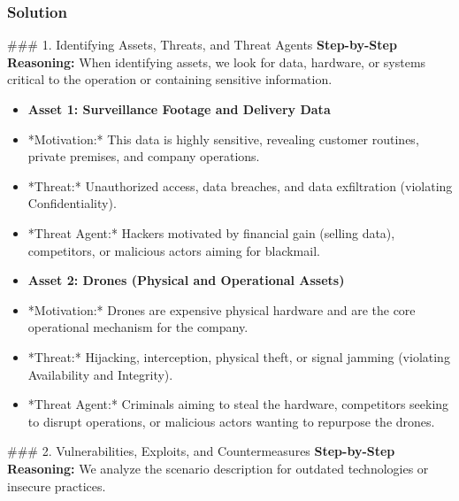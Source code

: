 \documentclass{article}
\begin{document}
\subsubsection*{Solution}
\#\#\# 1. Identifying Assets, Threats, and Threat Agents
\textbf{Step-by-Step Reasoning:}
When identifying assets, we look for data, hardware, or systems critical to the operation or containing sensitive information.
\begin{itemize}
    \item \textbf{Asset 1: Surveillance Footage and Delivery Data}
    \item *Motivation:* This data is highly sensitive, revealing customer routines, private premises, and company operations.
    \item *Threat:* Unauthorized access, data breaches, and data exfiltration (violating Confidentiality).
    \item *Threat Agent:* Hackers motivated by financial gain (selling data), competitors, or malicious actors aiming for blackmail.
    \item \textbf{Asset 2: Drones (Physical and Operational Assets)}
    \item *Motivation:* Drones are expensive physical hardware and are the core operational mechanism for the company.
    \item *Threat:* Hijacking, interception, physical theft, or signal jamming (violating Availability and Integrity).
    \item *Threat Agent:* Criminals aiming to steal the hardware, competitors seeking to disrupt operations, or malicious actors wanting to repurpose the drones.

\end{itemize}
\#\#\# 2. Vulnerabilities, Exploits, and Countermeasures
\textbf{Step-by-Step Reasoning:}
We analyze the scenario description for outdated technologies or insecure practices.
\end{document}
